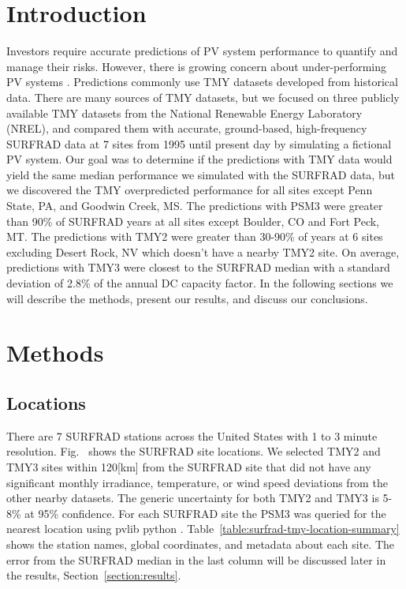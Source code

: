 \documentclass[conference]{IEEEtran}
\begin{document}
\section{Introduction}
Investors require accurate predictions of PV system performance to quantify and manage their risks. However, there is growing concern about under-performing PV systems \cite{Matsui2020}. Predictions commonly use TMY datasets developed from historical data. There are many sources of TMY datasets, but we focused on three publicly available TMY datasets from the National Renewable Energy Laboratory (NREL), and compared them with accurate, ground-based, high-frequency SURFRAD data at 7 sites from 1995 until present day \cite{Augustine2000} by simulating a fictional PV system. Our goal was to determine if the predictions with TMY data would yield the same median performance we simulated with the SURFRAD data, but we discovered the TMY overpredicted performance for all sites except Penn State, PA, and Goodwin Creek, MS. The predictions with PSM3 were greater than 90\% of SURFRAD years at all sites except Boulder, CO and Fort Peck, MT. The predictions with TMY2 were greater than 30-90\% of years at 6 sites excluding Desert Rock, NV which doesn't have a nearby TMY2 site. On average, predictions with TMY3 were closest to the SURFRAD median with a standard deviation of 2.8\% of the annual DC capacity factor. In the following sections we will describe the methods, present our results, and discuss our conclusions.

\section{Methods}
\subsection{Locations}
There are 7 SURFRAD stations \cite{Augustine2000} across \cite{Bowersox2021} the United States with 1 to 3 minute resolution. Fig.~ shows the SURFRAD site locations. We selected TMY2 \cite{Marion1995} and TMY3 \cite{Wilcox2012} sites within 120[km] from the SURFRAD site that did not have any significant monthly irradiance, temperature, or wind speed deviations from the other nearby datasets. The generic uncertainty for both TMY2 and TMY3 is 5-8\% at 95\% confidence. For each SURFRAD site the PSM3 was queried for the nearest location using pvlib python \cite{F.Holmgren2018}. Table~\ref{table:surfrad-tmy-location-summary} shows the station names, global coordinates, and metadata about each site. The error from the SURFRAD median in the last column will be discussed later in the results, Section~\ref{section:results}.
\end{document}
